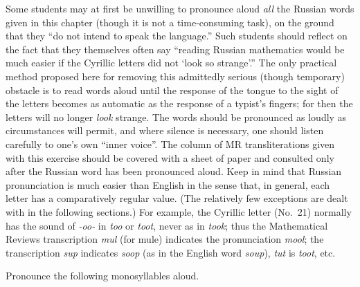 Some students may at first be unwilling to pronounce aloud \emph{all} the Russian words given in this chapter (though it is not a time-consuming task), on the ground that they ``do not intend to speak the language.'' Such students should reflect on the fact that they themselves often say ``reading Russian mathematics would be much easier if the Cyrillic letters did not `look so strange'.'' The only practical method proposed here for removing this admittedly serious (though temporary) obstacle is to read words aloud until the response of the tongue to the sight of the letters becomes as automatic as the response of a typist's fingers; for then the letters will no longer \emph{look} strange. The words should be pronounced as loudly as circumstances will permit, and where silence is necessary, one should listen carefully to one's own ``inner voice''. The column of MR transliterations given with this exercise should be covered with a sheet of paper and consulted only after the Russian word has been pronounced aloud. Keep in mind that Russian pronunciation is much easier than English in the sense that, in general, each letter has a comparatively regular value. (The relatively few exceptions are dealt with in the following sections.) For example, the Cyrillic letter  (No.~21) normally has the sound of \emph{-oo-} in \emph{too} or \emph{toot}, never as in \emph{took}; thus the Mathematical Reviews transcription \emph{mul} (for  mule) indicates the pronunciation \emph{mool}; the transcription \emph{sup} indicates \emph{soop} (as in the English word \emph{soup}), \emph{tut} is \emph{toot}, etc.

\begin{keybox}[Exercise 2.1]
Pronounce the following monosyllables aloud.
\end{keybox}

